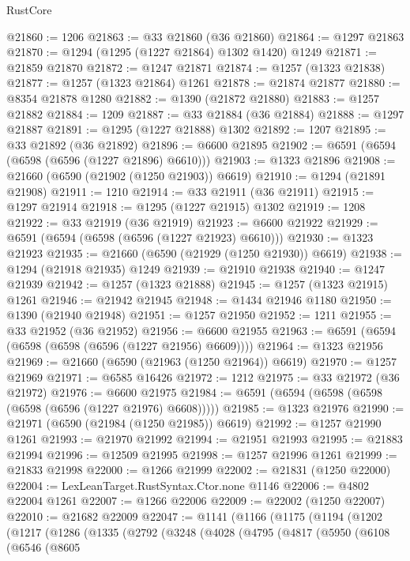 \begin{lexlean}{RustCore}
\begin{coremodule}
@21860 := 1206
@21863 := @33 @21860 (@36 @21860)
@21864 := @1297 @21863
@21870 := @1294 (@1295 (@1227 @21864) @1302 @1420) @1249
@21871 := @21859 @21870
@21872 := @1247 @21871
@21874 := @1257 (@1323 @21838)
@21877 := @1257 (@1323 @21864) @1261
@21878 := @21874 @21877
@21880 := @8354 @21878 @1280
@21882 := @1390 (@21872 @21880)
@21883 := @1257 @21882
@21884 := 1209
@21887 := @33 @21884 (@36 @21884)
@21888 := @1297 @21887
@21891 := @1295 (@1227 @21888) @1302
@21892 := 1207
@21895 := @33 @21892 (@36 @21892)
@21896 := @6600 @21895
@21902 := @6591 (@6594 (@6598 (@6596 (@1227 @21896) @6610)))
@21903 := @1323 @21896
@21908 := @21660 (@6590 (@21902 (@1250 @21903)) @6619)
@21910 := @1294 (@21891 @21908)
@21911 := 1210
@21914 := @33 @21911 (@36 @21911)
@21915 := @1297 @21914
@21918 := @1295 (@1227 @21915) @1302
@21919 := 1208
@21922 := @33 @21919 (@36 @21919)
@21923 := @6600 @21922
@21929 := @6591 (@6594 (@6598 (@6596 (@1227 @21923) @6610)))
@21930 := @1323 @21923
@21935 := @21660 (@6590 (@21929 (@1250 @21930)) @6619)
@21938 := @1294 (@21918 @21935) @1249
@21939 := @21910 @21938
@21940 := @1247 @21939
@21942 := @1257 (@1323 @21888)
@21945 := @1257 (@1323 @21915) @1261
@21946 := @21942 @21945
@21948 := @1434 @21946 @1180
@21950 := @1390 (@21940 @21948)
@21951 := @1257 @21950
@21952 := 1211
@21955 := @33 @21952 (@36 @21952)
@21956 := @6600 @21955
@21963 := @6591 (@6594 (@6598 (@6598 (@6596 (@1227 @21956) @6609))))
@21964 := @1323 @21956
@21969 := @21660 (@6590 (@21963 (@1250 @21964)) @6619)
@21970 := @1257 @21969
@21971 := @6585 @16426
@21972 := 1212
@21975 := @33 @21972 (@36 @21972)
@21976 := @6600 @21975
@21984 := @6591 (@6594 (@6598 (@6598 (@6598 (@6596 (@1227 @21976) @6608)))))
@21985 := @1323 @21976
@21990 := @21971 (@6590 (@21984 (@1250 @21985)) @6619)
@21992 := @1257 @21990 @1261
@21993 := @21970 @21992
@21994 := @21951 @21993
@21995 := @21883 @21994
@21996 := @12509 @21995
@21998 := @1257 @21996 @1261
@21999 := @21833 @21998
@22000 := @1266 @21999
@22002 := @21831 (@1250 @22000)
@22004 := LexLeanTarget.RustSyntax.Ctor.none @1146
@22006 := @4802 @22004 @1261
@22007 := @1266 @22006
@22009 := @22002 (@1250 @22007)
@22010 := @21682 @22009
@22047 := @1141
    (@1166
      (@1175
        (@1194
          (@1202
            (@1217
              (@1286
                (@1335
                  (@2792
                    (@3248
                      (@4028
                        (@4795
                          (@4817
                            (@5950
                              (@6108
                                (@6546
                                  (@8605

\end{coremodule}
\end{lexlean}
